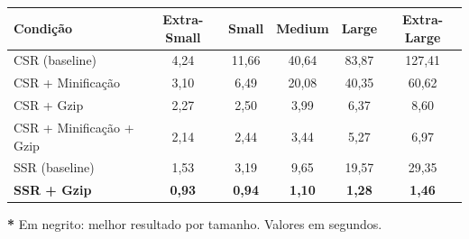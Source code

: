 \begin{table}[htbp]
\centering
\footnotesize
\caption{}
\begin{tabular}{|l|c|c|c|c|c|}
\hline
\textbf{Condição} & \textbf{Extra-Small} & \textbf{Small} & \textbf{Medium} & \textbf{Large} & \textbf{Extra-Large} \\
\hline
CSR (baseline)               & 4,24  & 11,66 & 40,64 & 83,87  & 127,41 \\
CSR + Minificação            & 3,10  &  6,49 & 20,08 & 40,35  &  60,62 \\
CSR + Gzip                   & 2,27  &  2,50 &  3,99 &  6,37  &   8,60 \\
CSR + Minificação + Gzip     & 2,14  &  2,44 &  3,44 &  5,27  &   6,97 \\
SSR (baseline)               & 1,53  &  3,19 &  9,65 & 19,57  &  29,35 \\
\textbf{SSR + Gzip}          & \textbf{0,93} & \textbf{0,94} & \textbf{1,10} & \textbf{1,28} & \textbf{1,46} \\
\hline
\end{tabular}
\vspace{2pt}
\begin{flushleft}
\footnotesize
\textbf{*} Em negrito: melhor resultado por tamanho. Valores em segundos.
\end{flushleft}
\label{tab:tti-medians}
\end{table}
